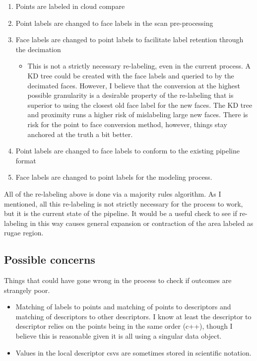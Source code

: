 \documentclass[11pt]{article}
\theoremstyle{definition}
\begin{document}
\begin{itemize}
    \begin{enumerate}
        \item Points are labeled in cloud compare
        \item Point labels are changed to face labels in the scan pre-processing
        \item Face labels are changed to point labels to facilitate label retention through the decimation
        \begin{itemize}
            \item This is not a strictly necessary re-labeling, even in the current process. A KD tree could be created with the face labels and queried to by the decimated faces. However, I believe that the conversion at the highest possible granularity is a desirable property of the re-labeling that is superior to using the closest old face label for the new faces. The KD tree and proximity runs a higher risk of mislabeling large new faces. There is risk for the point to face conversion method, however, things stay anchored at the truth a bit better. 
        \end{itemize}
        \item Point labels are changed to face labels to conform to the existing pipeline format
        \item Face labels are changed to point labels for the modeling process.
    \end{enumerate}
    All of the re-labeling above is done via a majority rules algorithm. As I mentioned, all this re-labeling is not strictly necessary for the process to work, but it is the current state of the pipeline. It would be a useful check to see if re-labeling in this way causes general expansion or contraction of the area labeled as rugae region. 
\end{itemize}

\subsection{Possible concerns}

Things that could have gone wrong in the process to check if outcomes are strangely poor.

\begin{itemize}
    \item Matching of labels to points and matching of points to descriptors and matching of descriptors to other descriptors. I know at least the descriptor to descriptor relies on the points being in the same order (c++), though I believe this is reasonable given it is all using a singular data object.
    \item Values in the local descriptor csvs are sometimes stored in scientific notation.
\end{itemize}
\end{document}
